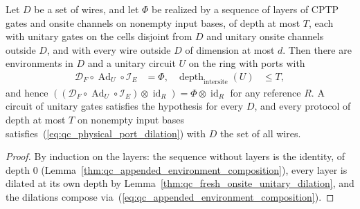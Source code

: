 \begin{lemma}
    \label{thm:qc_physical_port_unitary_dilation}
    \leanok
    Let $D$ be a set of wires, and let $\Phi$ be realized by a sequence of layers of CPTP
    gates and onsite channels on nonempty input bases, of depth at most $T$, each with unitary
    gates on the cells disjoint from $D$ and unitary onsite channels outside $D$, and with every
    wire outside $D$ of dimension at most $d$. Then there are environments in $D$ and a unitary
    circuit $U$ on the ring with ports with
    \begin{align}
        \mathcal D_F\circ\operatorname{Ad}_U\circ\mathcal I_E & =\Phi,
                                                              & \operatorname{depth}_{\mathrm{intersite}}(U) & \leq T,
        \label{eq:qc_physical_port_dilation}
    \end{align}
    and hence $((\mathcal D_F\circ\operatorname{Ad}_U\circ\mathcal I_E)\otimes\operatorname{id}_R)=\Phi\otimes\operatorname{id}_R$ for any reference $R$. A circuit of unitary gates satisfies the hypothesis for every $D$, and every protocol of depth at most $T$ on nonempty input bases satisfies~(\ref{eq:qc_physical_port_dilation}) with $D$ the set of all wires.
\end{lemma}
\begin{proof}\leanok
    By induction on the layers: the sequence without layers is the identity, of depth $0$
    (Lemma~\ref{thm:qc_appended_environment_composition}), every layer is dilated at its own
    depth by Lemma~\ref{thm:qc_fresh_onsite_unitary_dilation}, and the dilations compose
    via~(\ref{eq:qc_appended_environment_composition}).
\end{proof}

